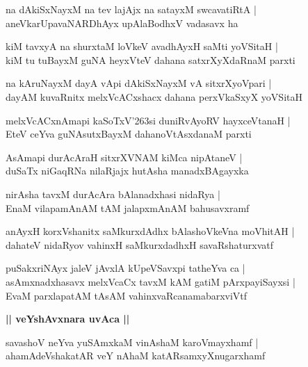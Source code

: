 \documentclass[twoside,12pt,openright]{book}
\def\S{\char'263}
\newcounter{shloka}[chapter]
\def\uvaca#1{\centerline{{\large\textbf{#1}}}}
\begin{document}
\begin{shloka}
na dAkiSxNayxM na tev lajAjx na satayxM swcavatiRtA |\\
aneVkarUpavaNARDhAyx upAlaBodhxV vadasavx ha 
\end{shloka}

\begin{shloka}
kiM tavxyA na shurxtaM loVkeV avadhAyxH saMti yoVSitaH |\\
kiM tu tuBayxM guNA heyxVteV dahana satxrXyXdaRnaM parxti 
\end{shloka}

\begin{shloka}
na kAruNayxM dayA vApi dAkiSxNayxM vA sitxrXyoVpari |\\
dayAM kuvaRnitx melxVcACxshacx dahana perxVkaSxyX yoVSitaH
\end{shloka}

\begin{shloka}
melxVcACxnAmapi kaSoTxV\S si duniRvAyoRV hayxceVtanaH |\\
EteV ceYva guNAsutxBayxM dahanoVtAsxdanaM parxti
\end{shloka}

\begin{shloka}
AsAmapi durAcAraH sitxrXVNAM kiMca nipAtaneV |\\
duSaTx niGaqRNa nilaRjajx hutAsha manadxBAgayxka
\end{shloka}

\begin{shloka}
nirAsha tavxM durAcAra bAlanadxhasi nidaRya |\\
EnaM vilapamAnAM tAM jalapxmAnAM bahusavxramf 
\end{shloka}

\begin{shloka}
anAyxH korxVshanitx saMkurxdAdhx bAlashoVkeVna moVhitAH |\\
dahateV nidaRyov vahinxH saMkurxdadhxH savaRshaturxvatf
\end{shloka}

\begin{shloka}
puSakxriNAyx jaleV jAvxlA kUpeVSavxpi tatheYva ca |\\
asAmxnadxhasavx melxVcaCx tavxM kAM gatiM pArxpayiSayxsi |\\
EvaM parxlapatAM tAsAM vahinxvaRcanamabarxviVtf
\end{shloka}


\uvaca{|| veYshAvxnara uvAca ||}

\begin{shloka}
savashoV neYva yuSAmxkaM vinAshaM karoVmayxhamf |\\
ahamAdeVshakatAR veY nAhaM katARsamxyXnugarxhamf
\end{shloka}
\end{document}
